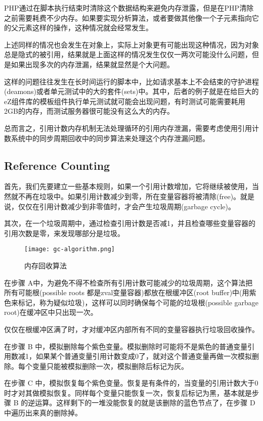 PHP通过在脚本执行结束时清除这个数据结构来避免内存泄露，但是在PHP清除之前需要耗费不少内存。如果要实现分析算法，或者要做其他像一个子元素指向它的父元素这样的操作，这种情况就会经常发生。

上述同样的情况也会发生在对象上，实际上对象更有可能出现这种情况，因为对象总是隐式的被引用，结果就是上面这样的情况发生仅仅一两次可能没什么问题，但是如果出现多次的内存泄漏，结果就显然是个大问题。

这样的问题往往发生在长时间运行的脚本中，比如请求基本上不会结束的守护进程(deamons)或者单元测试中的大的套件(sets)中。其中，后者的例子就是在给巨大的eZ组件库的模板组件执行单元测试就可能会出现问题，有时测试可能需要耗用2GB的内存，而测试服务器很可能没有这么大的内存。

总而言之，引用计数内存机制无法处理循环的引用内存泄漏，需要考虑使用引用计数系统中的同步周期回收中的同步算法来处理这个内存泄漏问题。




\subsection{Reference Counting}

首先，我们先要建立一些基本规则，如果一个引用计数增加，它将继续被使用，当然就不再在垃圾中。如果引用计数减少到零，所在变量容器将被清除(free)。就是说，仅仅在引用计数减少到非零值时，才会产生垃圾周期(garbage cycle)。

其次，在一个垃圾周期中，通过检查引用计数是否减1，并且检查哪些变量容器的引用次数是零，来发现哪部分是垃圾。

\begin{figure}[htbp]
\centering
\texttt{[image: gc-algorithm.png]}
\caption{内存回收算法}
\end{figure}


在步骤 A中，为避免不得不检查所有引用计数可能减少的垃圾周期，这个算法把所有可能根(possible roots 都是zval变量容器)都放在根缓冲区(root buffer)中(用紫色来标记，称为疑似垃圾)，这样可以同时确保每个可能的垃圾根(possible garbage root)在缓冲区中只出现一次。

仅仅在根缓冲区满了时，才对缓冲区内部所有不同的变量容器执行垃圾回收操作。

在步骤 B 中，模拟删除每个紫色变量。模拟删除时可能将不是紫色的普通变量引用数减1，如果某个普通变量引用计数变成0了，就对这个普通变量再做一次模拟删除。每个变量只能被模拟删除一次，模拟删除后标记为灰。

在步骤 C 中，模拟恢复每个紫色变量。恢复是有条件的，当变量的引用计数大于0时才对其做模拟恢复。同样每个变量只能恢复一次，恢复后标记为黑，基本就是步骤 B 的逆运算。这样剩下的一堆没能恢复的就是该删除的蓝色节点了，在步骤 D 中遍历出来真的删除掉。

